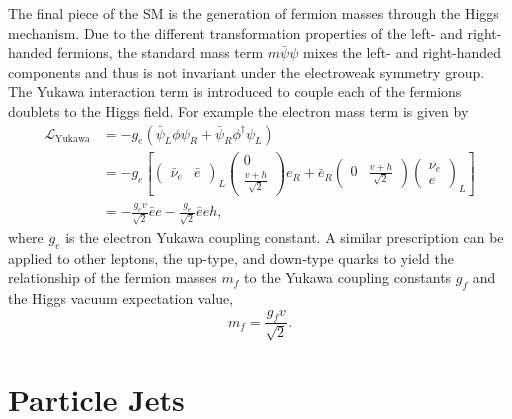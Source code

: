 The final piece of the SM is the generation of fermion masses through the Higgs mechanism.
Due to the different transformation properties of the left- and right-handed fermions, the standard mass term $m \bar \psi \psi$ mixes the left- and right-handed components and thus is not invariant under the electroweak symmetry group.
The Yukawa interaction term is introduced to couple each of the fermions doublets to the Higgs field.
For example the electron mass term is given by
\begin{equation}
    \label{eq:yukawa}
    \begin{split}
        \mathcal{L}_\text{Yukawa} & = -g_e( \bar \psi_L \phi \psi_R + \bar \psi_R \phi^\dagger \psi_L)    \\
                                  & = -g_e \left[
            \begin{pmatrix} \bar \nu_e & \bar e \end{pmatrix}_L \begin{pmatrix} 0 \\ \frac{v + h}{\sqrt{2}} \end{pmatrix} e_R
            + \bar e_R \begin{pmatrix} 0 & \frac{v + h}{\sqrt{2}} \end{pmatrix} \begin{pmatrix} \nu_e \\ e \end{pmatrix}_L
        \right]                                                                                           \\
                                  & = -\frac{g_e v}{\sqrt{2}} \bar e e - \frac{g_e}{\sqrt{2}} \bar e e h,
    \end{split}
\end{equation}
where $g_e$ is the electron Yukawa coupling constant.
A similar prescription can be applied to other leptons, the up-type, and down-type quarks to yield the relationship of the fermion masses $m_f$ to the Yukawa coupling constants $g_f$ and the Higgs vacuum expectation value,
\begin{equation}
    \label{eq:fermion_mass}
    m_f = \frac{g_f v}{\sqrt{2}}.
\end{equation}

\section{Particle Jets}
\label{sec:jets}

